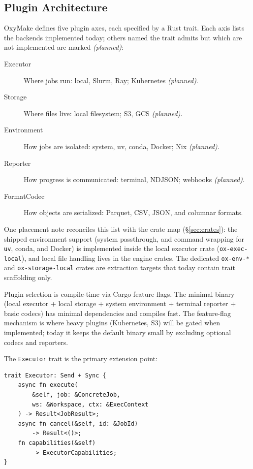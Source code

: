 \documentclass[12pt,a4paper]{article}
\newcommand{\code}[1]{{\texttt{\small\color{inlinecode}#1}}}
\begin{document}
\subsection{Plugin Architecture}
\label{sec:plugins}

OxyMake defines five plugin axes, each specified by a Rust trait. Each
axis lists the backends implemented today; others named the trait admits
but which are not implemented are marked \emph{(planned)}:

\begin{description}
\item[Executor] Where jobs run: local, Slurm, Ray; Kubernetes \emph{(planned)}.
\item[Storage] Where files live: local filesystem; S3, GCS \emph{(planned)}.
\item[Environment] How jobs are isolated: system, uv, conda, Docker; Nix \emph{(planned)}.
\item[Reporter] How progress is communicated: terminal, NDJSON; webhooks \emph{(planned)}.
\item[FormatCodec] How objects are serialized: Parquet, CSV, JSON, and columnar formats.
\end{description}

\noindent One placement note reconciles this list with the crate map
(\S\ref{sec:crates}): the shipped environment support (system
passthrough, and command wrapping for \code{uv}, conda, and Docker) is
implemented inside the local executor crate
(\code{ox-exec-local}), and local file handling lives in the engine
crates. The dedicated \code{ox-env-*} and \code{ox-storage-local}
crates are extraction targets that today contain trait scaffolding
only.

Plugin selection is compile-time via Cargo feature flags. The minimal binary
(local executor + local storage + system environment + terminal reporter +
basic codecs) has minimal dependencies and compiles fast. The feature-flag
mechanism is where heavy plugins (Kubernetes, S3) will be gated when
implemented; today it keeps the default binary small by excluding
optional codecs and reporters.

The \code{Executor} trait is the primary extension point:

\begin{lstlisting}[style=rust]
trait Executor: Send + Sync {
    async fn execute(
        &self, job: &ConcreteJob,
        ws: &Workspace, ctx: &ExecContext
    ) -> Result<JobResult>;
    async fn cancel(&self, id: &JobId)
        -> Result<()>;
    fn capabilities(&self)
        -> ExecutorCapabilities;
}
\end{lstlisting}
\end{document}
